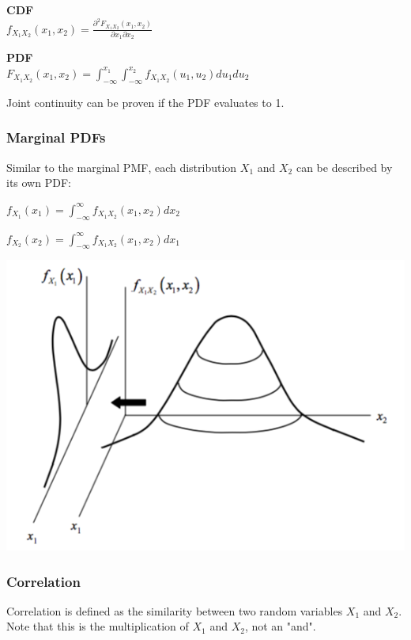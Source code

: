 \documentclass[11pt]{article}
\begin{document}
\begin{center}
    \textbf{CDF} \\
    
    $f_{X_1X_2}(x_1,x_2) = \frac{\partial^2F_{X_1X_2}(x_1,x_2) }{\partial x_1 \partial x_2}$
\end{center}

\begin{center}
    \textbf{PDF} \\ 
    $F_{X_1X_2}(x_1,x_2) = \int_{-\infty}^{x_1} \int_{-\infty}^{x_2} f_{X_1X_2}(u_1,u_2)du_1du_2$
\end{center}

Joint continuity can be proven if the PDF evaluates to 1.

\subsubsection{Marginal PDFs}

Similar to the marginal PMF, each distribution $X_1$ and $X_2$ can be described by its own PDF:

\begin{center}
$f_{X_1}(x_1) = \int_{-\infty}^{\infty} f_{X_1X_2}(x_1,x_2)dx_2$ 
\end{center}
\begin{center}
    $f_{X_2}(x_2) = \int_{-\infty}^{\infty} f_{X_1X_2}(x_1,x_2)dx_1$ 
\end{center}
\begin{center}
    \includegraphics[width=300 px]{img/marginal-pdf}  \\
\end{center}

\subsubsection{Correlation}

Correlation is defined as the similarity between two random variables $X_1$ and $X_2$. Note that this is the multiplication of $X_1$ and $X_2$, not an "and".
\end{document}
